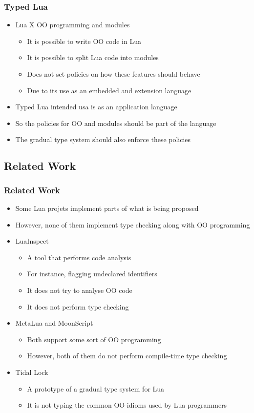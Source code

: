 \documentclass{beamer}
\begin{document}
\begin{frame}
\frametitle{Typed Lua}
\begin{itemize}
\item Lua X OO programming and modules
\begin{itemize}
\item It is possible to write OO code in Lua
\item It is possible to split Lua code into modules
\item Does not set policies on how these features should behave
\item Due to its use as an embedded and extension language
\end{itemize}
\item Typed Lua intended usa is as an application language
\item So the policies for OO and modules should be part of the language
\item The gradual type system should also enforce these policies
\end{itemize}
\end{frame}

\subsection{Related Work}
\begin{frame}
\frametitle{Related Work}
\begin{itemize}
\item Some Lua projets implement parts of what is being proposed
\item However, none of them implement type checking along with OO programming
\item LuaInspect
\begin{itemize}
\item A tool that performs code analysis
\item For instance, flagging undeclared identifiers
\item It does not try to analyse OO code
\item It does not perform type checking
\end{itemize}
\item MetaLua and MoonScript
\begin{itemize}
\item Both support some sort of OO programming
\item However, both of them do not perform compile-time type checking
\end{itemize}
\item Tidal Lock
\begin{itemize}
\item A prototype of a gradual type system for Lua
\item It is not typing the common OO idioms used by Lua programmers
\end{itemize}
\end{itemize}
\end{frame}
\end{document}
